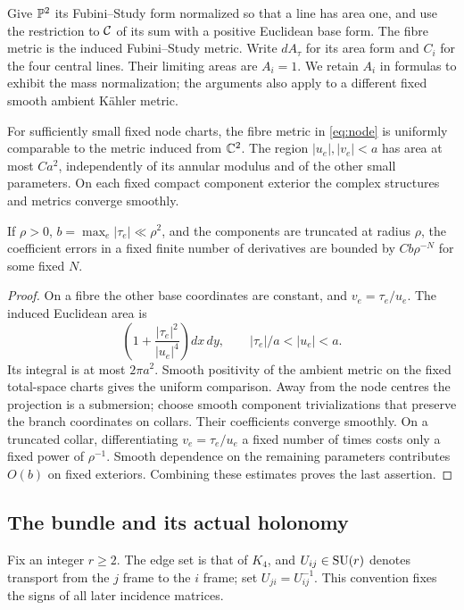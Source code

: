 Give $\mathbb P^2$ its Fubini--Study form normalized so that a line has
area one, and use the restriction to $\mathcal C$ of its sum with a
positive Euclidean base form. The fibre metric is the induced
Fubini--Study metric. Write $dA_\tau$ for its area form and
$C_i$ for the four central lines. Their limiting areas are
$A_i=1$. We retain $A_i$ in formulas to exhibit the mass
normalization; the arguments also apply to a different fixed
smooth ambient K\"ahler metric.

\begin{lemma}\label{lem:ambient}
For sufficiently small fixed node charts, the fibre metric in
\eqref{eq:node} is uniformly comparable to the metric induced
from $\mathbb C^2$. The region $|u_e|,|v_e|<a$ has area at most $Ca^2$,
independently of its annular modulus and of the other small
parameters. On each fixed compact component exterior the
complex structures and metrics converge smoothly.

If $\rho>0$, $b=\max_e|\tau_e|\ll\rho^2$, and the components are
truncated at radius $\rho$, the coefficient errors in a fixed
finite number of derivatives are bounded by $Cb\rho^{-N}$ for
some fixed $N$.
\end{lemma}
\begin{proof}
On a fibre the other base coordinates are constant, and
$v_e=\tau_e/u_e$. The induced Euclidean area is
\[
 \left(1+\frac{|\tau_e|^2}{|u_e|^4}\right)dx\,dy,
 \qquad |\tau_e|/a<|u_e|<a .
\]
Its integral is at most $2\pi a^2$. Smooth positivity of the
ambient metric on the fixed total-space charts gives the
uniform comparison. Away from the node centres the projection
is a submersion; choose smooth component trivializations that
preserve the branch coordinates on collars. Their coefficients
converge smoothly. On a truncated collar, differentiating
$v_e=\tau_e/u_e$ a fixed number of times costs only a fixed
power of $\rho^{-1}$. Smooth dependence on the remaining
parameters contributes $O(b)$ on fixed exteriors. Combining
these estimates proves the last assertion.
\end{proof}

\subsection{The bundle and its actual holonomy}
Fix an integer $r\ge2$. The edge set is that of $K_4$, and
$U_{ij}\in\operatorname{SU}(r)$ denotes transport from the $j$ frame to the
$i$ frame; set $U_{ji}=U_{ij}^{-1}$. This convention fixes the
signs of all later incidence matrices.


